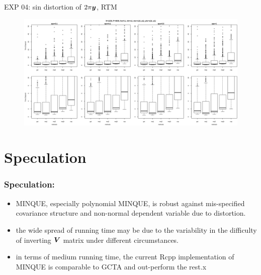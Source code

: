 \documentclass{beamer}
\begin{document}
\begin{frame}{EXP 04: sin distortion of $2\pi\boldsymbol{y}$, RTM}
  \begin{figure}\includegraphics[width=1.00\linewidth]{t04_bxp.png}\end{figure}
\end{frame}
\section{Speculation}
\frametitle{Speculation:}
\begin{frame}
  \begin{itemize}
  \item MINQUE, especially polynomial MINQUE, is robust against
    mis-specified covariance structure and non-normal dependent
    variable due to distortion.
  \item the wide spread of running time may be due to the variability
    in the difficulty of inverting $\boldsymbol{V}$ matrix under different 
    circumstances.
  \item in terms of medium running time, the current Rcpp implementation
    of MINQUE is comparable to GCTA and out-perform the rest.x
  \end{itemize}
\end{frame}
\end{document}
